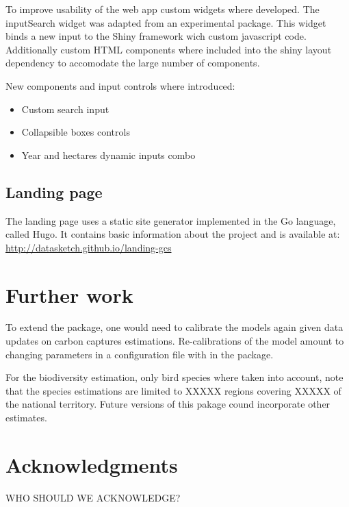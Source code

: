\documentclass[
]{jss}
\providecommand{\tightlist}{%
  \setlength{\itemsep}{0pt}\setlength{\parskip}{0pt}}
\begin{document}
To improve usability of the web app custom widgets where developed. The
inputSearch widget was adapted from an experimental package. This widget
binds a new input to the Shiny framework wich custom javascript code.
Additionally custom HTML components where included into the shiny layout
dependency to accomodate the large number of components.

New components and input controls where introduced:

\begin{itemize}
\tightlist
\item
  Custom search input
\item
  Collapsible boxes controls
\item
  Year and hectares dynamic inputs combo
\end{itemize}

\hypertarget{landing-page}{%
\subsection{Landing page}\label{landing-page}}

The landing page uses a static site generator implemented in the Go
language, called Hugo. It contains basic information about the project
and is available at: \url{http://datasketch.github.io/landing-gcs}

\hypertarget{further-work}{%
\section{Further work}\label{further-work}}

To extend the package, one would need to calibrate the models again
given data updates on carbon captures estimations. Re-calibrations of
the model amount to changing parameters in a configuration file with in
the package.

For the biodiversity estimation, only bird species where taken into
account, note that the species estimations are limited to XXXXX regions
covering XXXXX of the national territory. Future versions of this pakage
cound incorporate other estimates.

\hypertarget{acknowledgments}{%
\section{Acknowledgments}\label{acknowledgments}}

WHO SHOULD WE ACKNOWLEDGE?


\end{document}
